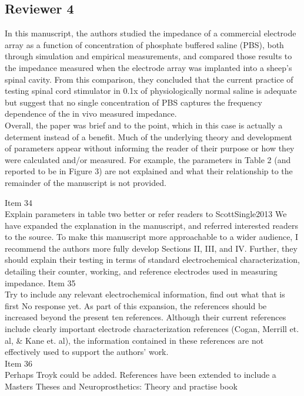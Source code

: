 \documentclass[journal, a4paper]{IEEEtran}
\begin{document}
\subsection*{Reviewer 4}
{\color{blue}
In this manuscript, the authors studied the impedance of a commercial electrode array as a function of concentration of phosphate buffered saline (PBS), both through simulation and empirical measurements, and compared those results to the impedance measured when the electrode array was implanted into a sheep's spinal cavity. From this comparison, they concluded that the current practice of testing spinal cord stimulator in 0.1x of physiologically normal saline is adequate but suggest that no single concentration of PBS captures the frequency dependence of the in vivo measured impedance.\\

Overall, the paper was brief and to the point, which in this case is actually a determent instead of a benefit. Much of the underlying theory and development of parameters appear without informing the reader of their purpose or how they were calculated and/or measured. 
For example, the parameters in Table 2 (and reported to be in Figure 3) are not explained and what their relationship to the remainder of the manuscript is not provided. 

{\color{OliveGreen}
    Item 34\\
    {\color{Red} Explain parameters in table two better or refer readers to ScottSingle2013}
    We have expanded the explanation in the manuscript, and referred interested readers to the source.
}
To make this manuscript more approachable to a wider audience, I recommend the authors more fully develop Sections II, III, and IV. Further, they should explain their testing in terms of standard electrochemical characterization, detailing their counter, working, and reference electrodes used in measuring impedance. 
{\color{OliveGreen}
    Item 35\\
    {\color{Red} Try to include any relevant electrochemical information, find out what that is first}
    No response yet.
}
As part of this expansion, the references should be increased beyond the present ten references. Although their current references include clearly important electrode characterization references (Cogan, Merrill et. al, \& Kane et. al), the information contained in these references are not effectively used to support the authors’ work.\\
{\color{OliveGreen}
    Item 36\\
    {\color{Red} Perhaps Troyk could be added. References have been extended to include a Masters Theses and Neuroprosthetics: Theory and practise book}
} 


}
\end{document}
